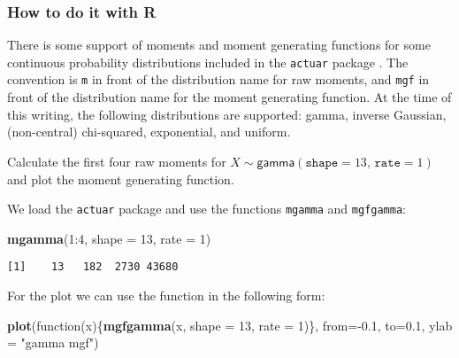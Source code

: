 \documentclass[]{book}
\newenvironment{Shaded}{\begin{snugshade}}{\end{snugshade}}
\newcommand{\KeywordTok}[1]{\textcolor[rgb]{0.13,0.29,0.53}{\textbf{{#1}}}}
\newcommand{\DataTypeTok}[1]{\textcolor[rgb]{0.13,0.29,0.53}{{#1}}}
\newcommand{\DecValTok}[1]{\textcolor[rgb]{0.00,0.00,0.81}{{#1}}}
\newcommand{\FloatTok}[1]{\textcolor[rgb]{0.00,0.00,0.81}{{#1}}}
\newcommand{\StringTok}[1]{\textcolor[rgb]{0.31,0.60,0.02}{{#1}}}
\newcommand{\NormalTok}[1]{{#1}}
\numberwithin{equation}{chapter}
\numberwithin{figure}{chapter}
\theoremstyle{plain}
\theoremstyle{definition}
\theoremstyle{remark}
\theoremstyle{definition}
\theoremstyle{definition}
\theoremstyle{remark}
\let\BeginKnitrBlock\begin \let\EndKnitrBlock\end
\begin{document}
\subsubsection{How to do it with R}\label{how-to-do-it-with-r-27}

There is some support of moments and moment generating functions for
some continuous probability distributions included in the
\texttt{actuar} package \autocite{actuar}. The convention is \texttt{m}
in front of the distribution name for raw moments, and \texttt{mgf} in
front of the distribution name for the moment generating function. At
the time of this writing, the following distributions are supported:
gamma, inverse Gaussian, (non-central) chi-squared, exponential, and
uniform.

\bigskip

\BeginKnitrBlock{example}
\protect\hypertarget{ex:unnamed-chunk-289}{}{\label{ex:unnamed-chunk-289}}Calculate
the first four raw moments for
\(X\sim\mathsf{gamma}(\mathtt{shape}=13,\,\mathtt{rate}=1)\) and plot
the moment generating function.
\EndKnitrBlock{example}

We load the \texttt{actuar} package and use the functions
\texttt{mgamma} and \texttt{mgfgamma}:

\begin{Shaded}
\begin{Highlighting}[]
\KeywordTok{mgamma}\NormalTok{(}\DecValTok{1}\NormalTok{:}\DecValTok{4}\NormalTok{, }\DataTypeTok{shape =} \DecValTok{13}\NormalTok{, }\DataTypeTok{rate =} \DecValTok{1}\NormalTok{)}
\end{Highlighting}
\end{Shaded}

\begin{verbatim}
[1]    13   182  2730 43680
\end{verbatim}

For the plot we can use the function in the following form:

\begin{Shaded}
\begin{Highlighting}[]
\KeywordTok{plot}\NormalTok{(function(x)\{}\KeywordTok{mgfgamma}\NormalTok{(x, }\DataTypeTok{shape =} \DecValTok{13}\NormalTok{, }\DataTypeTok{rate =} \DecValTok{1}\NormalTok{)\}, }
     \DataTypeTok{from=}\NormalTok{-}\FloatTok{0.1}\NormalTok{, }\DataTypeTok{to=}\FloatTok{0.1}\NormalTok{, }\DataTypeTok{ylab =} \StringTok{"gamma mgf"}\NormalTok{)}
\end{Highlighting}
\end{Shaded}
\end{document}
